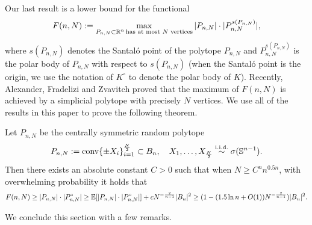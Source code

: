 Our last result is a lower bound for the  functional
\[
F(n,N) := \max_{P_{n,N} \subset \operatorname{\mathbb{R}}^{n} \text {has at most $N$ vertices}} |P_{n,N}|\cdot|P^{s(P_{n,N})}_{n,N}|,
\] where $s(P_{n,N})  $ denotes the Santal\'o point of the polytope $ P_{n,N} $ and  $ P^{s(P_{n,N})}_{n,N} $ is the polar body of $P_{n,N}$ with respect to $s(P_{n,N})$ (when the Santal\'o point is the origin, we use the notation of $K^\circ$ to denote the polar body of $K$). Recently, Alexander, Fradelizi and Zvavitch \cite[Theorem 3.4]{alexander2017polytopes} proved that the maximum of $F(n,N)$  is achieved by a simplicial polytope with precisely $N$ vertices. We use all of the results in this paper to prove the following theorem. %
\begin{theorem}\label{mahler}
	Let $ P_{n,N} $ be the centrally symmetric random polytope
	\[
	P_{n,N} := \operatorname{conv}\{\pm X_i\}_{i=1}^{\frac{N}{2}} \subset B_n, \quad X_1,\ldots,X_{\frac{N}{2}} \stackrel{\text{i.i.d.}}{\sim} \sigma(\mathbb{S}^{n-1}).
	\]
	Then there exists an absolute constant $C>0$ such that when $ N \geq C^nn^{0.5n}$, with overwhelming probability it holds that %
	\[
	F(n,N)  \geq |P_{n,N}|\cdot|P_{n,N}^{\circ}| \geq {\mathbb{E}}[|P_{n,N}|\cdot|P_{n,N}^{\circ}|] + cN^{-\frac 2{n-1}}|B_n|^2 \geq (1 - (1.5\ln n + O(1))N^{-\frac 2{n-1}})|B_n|^2.
	\]
%	
\end{theorem}

We conclude this section with a few remarks.

